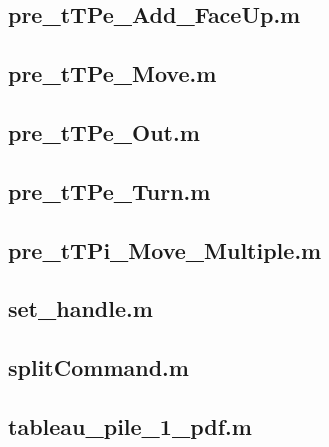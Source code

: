 \documentclass[runningheads,a4paper]{llncs}
\newcommand{\GPenSIM}{../GPenSIM}
\begin{document}
\subsection{pre\_tTPe\_Add\_FaceUp.m}
\label{app:pre_tTPe_Add_FaceUp.m}


\subsection{pre\_tTPe\_Move.m}
\label{app:pre_tTPe_Move.m}


\subsection{pre\_tTPe\_Out.m}
\label{app:pre_tTPe_Out.m}


\subsection{pre\_tTPe\_Turn.m}
\label{app:pre_tTPe_Turn.m}


\subsection{pre\_tTPi\_Move\_Multiple.m}
\label{app:pre_tTPi_Move_Multiple.m}


\subsection{set\_handle.m}
\label{app:set_handle.m}


\subsection{splitCommand.m}
\label{app:splitCommand.m}


\subsection{tableau\_pile\_1\_pdf.m}
\label{app:tableau_pile_1_pdf.m}

\end{document}
